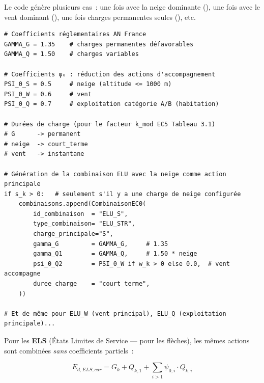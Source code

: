 Le code g\'en\`ere plusieurs cas~: une fois avec la neige dominante
(), une fois avec le vent dominant (),
une fois charges permanentes seules (), etc.

\begin{lstlisting}[style=python, caption={Extrait de \fichier{ec0/combinaisons.py} --- coefficients AN France et génération}]
# Coefficients réglementaires AN France
GAMMA_G = 1.35    # charges permanentes défavorables
GAMMA_Q = 1.50    # charges variables

# Coefficients ψ₀ : réduction des actions d'accompagnement
PSI_0_S = 0.5     # neige (altitude <= 1000 m)
PSI_0_W = 0.6     # vent
PSI_0_Q = 0.7     # exploitation catégorie A/B (habitation)

# Durées de charge (pour le facteur k_mod EC5 Tableau 3.1)
# G      -> permanent
# neige  -> court_terme
# vent   -> instantane

# Génération de la combinaison ELU avec la neige comme action principale
if s_k > 0:   # seulement s'il y a une charge de neige configurée
    combinaisons.append(CombinaisonEC0(
        id_combinaison  = "ELU_S",
        type_combinaison= "ELU_STR",
        charge_principale="S",
        gamma_G         = GAMMA_G,     # 1.35
        gamma_Q1        = GAMMA_Q,     # 1.50 * neige
        psi_0_Q2        = PSI_0_W if w_k > 0 else 0.0,  # vent accompagne
        duree_charge    = "court_terme",
    ))

# Et de même pour ELU_W (vent principal), ELU_Q (exploitation principale)...
\end{lstlisting}

Pour les \textbf{ELS} (\'Etats Limites de Service --- pour les fl\`eches),
les m\^emes actions sont combin\'ees \emph{sans} coefficients partiels~:

\begin{equation}
E_{d,ELS,car} = G_k + Q_{k,1} + \sum_{i>1} \psi_{0,i} \cdot Q_{k,i}
\label{eq:els_car}
\end{equation}